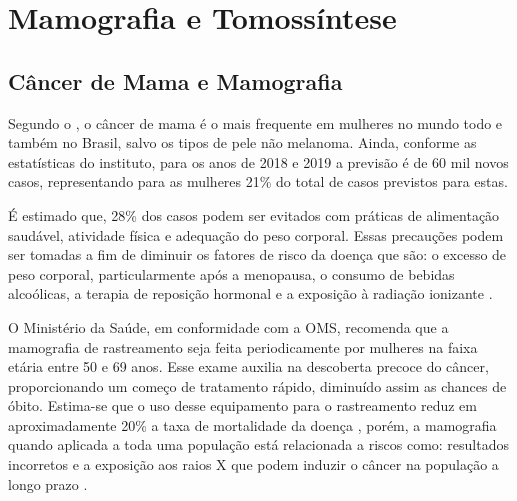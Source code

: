 \chapter[Mamografia e Tomossíntese]{Mamografia e Tomossíntese}\label{Capitulo2}

\section{Câncer de Mama e Mamografia}

Segundo o , o câncer de mama é o mais frequente em mulheres no mundo todo e também no Brasil, salvo os tipos de pele não melanoma. Ainda, conforme as estatísticas do instituto, para os anos de 2018 e 2019 a previsão é de 60 mil novos casos, representando para as mulheres 21\% do total de casos previstos para estas. 

É estimado que, 28\% dos casos podem ser evitados com práticas de alimentação saudável, atividade física  e adequação do peso corporal. Essas precauções podem ser tomadas a fim de diminuir os fatores de risco da doença que são: o excesso de peso corporal, particularmente após a menopausa, o consumo de bebidas alcoólicas, a terapia de reposição hormonal e a exposição à radiação ionizante \cite{inca}.

O Ministério da Saúde, em conformidade com a \ac{OMS}, recomenda que a mamografia de rastreamento seja feita periodicamente por mulheres na faixa etária entre 50 e 69 anos. Esse exame auxilia na descoberta precoce do câncer, proporcionando um começo de tratamento rápido, diminuído assim as chances de óbito. Estima-se que o uso desse equipamento para o rastreamento reduz em aproximadamente 20\% a taxa de mortalidade da doença \cite{oms}, porém, a mamografia quando aplicada a toda uma população está relacionada a riscos como: resultados incorretos e a exposição aos raios X que podem induzir o câncer na população a longo prazo \cite{yaffe2011risk,inca}. 


